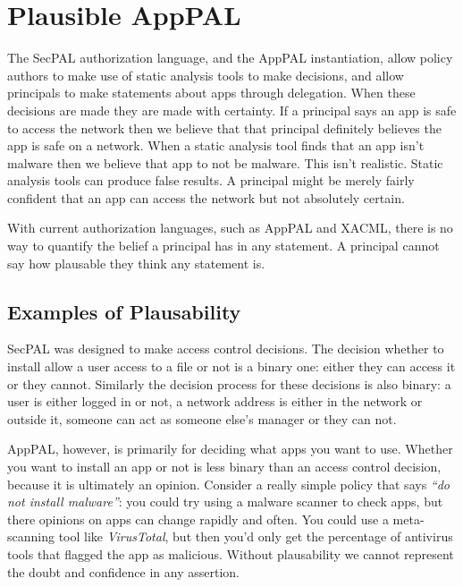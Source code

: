 \documentclass[thesis.tex]{subfiles}
\begin{document}
\section{Plausible AppPAL}

\newcommand{\secpalmath}[1]{\ensuremath\texttt{#1}}
\newcommand{\AC}[0]{\ensuremath\text{AC}}
\newcommand{\says}[1]{\ensuremath~\secpalmath{says}^{\new{#1}}~}
\newcommand{\canSay}[1]{\secpalmath{can-say}_{#1}}
\newcommand{\canActAs}[0]{\secpalmath{can-act-as}}
\newcommand{\spif}[0]{\secpalmath{if}}
\newcommand{\where}[0]{\secpalmath{where}}

The SecPAL authorization language, and the AppPAL instantiation, allow
policy authors to make use of static analysis tools to make decisions,
and allow principals to make statements about apps through delegation.
When these decisions are made they are made with certainty.  If a
principal says an app is safe to access the network then we believe
that that principal definitely believes the app is safe on a network.
When a static analysis tool finds that an app isn't malware then we
believe that app to not be malware.  This isn't realistic.  Static
analysis tools can produce false results.  A principal might be merely
fairly confident that an app can access the network but not absolutely
certain.

With current authorization languages, such as AppPAL and XACML, there
is no way to quantify the belief a principal has in any statement.  A
principal cannot say how plausable they think any statement is.

\subsection{Examples of Plausability}

SecPAL was designed to make access control decisions.  The decision
whether to install allow a user access to a file or not is a binary
one: either they can access it or they cannot.  Similarly the decision
process for these decisions is also binary: a user is either logged in
or not, a network address is either in the network or outside it,
someone can act as someone else's manager or they can not.

AppPAL, however, is primarily for deciding what apps you want to use.
Whether you want to install an app or not is less binary than an
access control decision, because it is ultimately an opinion.
Consider a really simple policy that says \emph{``do not install
malware''}: you could try using a malware scanner to check apps, but
there opinions on apps can change rapidly and often.  You could use a
meta-scanning tool like \emph{VirusTotal}, but then you'd only get the
percentage of antivirus tools that flagged the app as malicious.
Without plausability we cannot represent the doubt and confidence in
any assertion.
\end{document}
